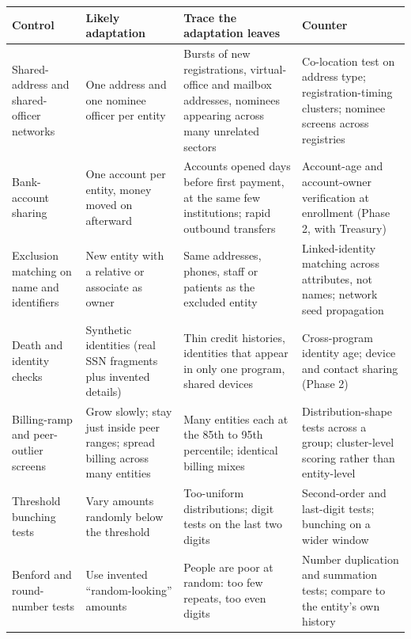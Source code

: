 \documentclass[letterpaper,11pt]{article}
\begin{document}
\begingroup\small\setlength{\tabcolsep}{4pt}\renewcommand{\arraystretch}{1.25}
\begin{longtable}[l]{@{}>{\raggedright\arraybackslash}p{}>{\raggedright\arraybackslash}p{}>{\raggedright\arraybackslash}p{}>{\raggedright\arraybackslash}p{}@{}}
\rowcolor{coolblack}\leavevmode\color{white}\bfseries Control & \leavevmode\color{white}\bfseries Likely adaptation & \leavevmode\color{white}\bfseries Trace the adaptation leaves & \leavevmode\color{white}\bfseries Counter \\
\endhead
Shared-address and shared-officer networks & One address and one nominee officer per entity & Bursts of new registrations, virtual-office and mailbox addresses, nominees appearing across many unrelated sectors & Co-location test on address type; registration-timing clusters; nominee screens across registries \\
Bank-account sharing & One account per entity, money moved on afterward & Accounts opened days before first payment, at the same few institutions; rapid outbound transfers & Account-age and account-owner verification at enrollment (Phase 2, with Treasury) \\
Exclusion matching on name and identifiers & New entity with a relative or associate as owner & Same addresses, phones, staff or patients as the excluded entity & Linked-identity matching across attributes, not names; network seed propagation \\
Death and identity checks & Synthetic identities (real SSN fragments plus invented details) & Thin credit histories, identities that appear in only one program, shared devices & Cross-program identity age; device and contact sharing (Phase 2) \\
Billing-ramp and peer-outlier screens & Grow slowly; stay just inside peer ranges; spread billing across many entities & Many entities each at the 85th to 95th percentile; identical billing mixes & Distribution-shape tests across a group; cluster-level scoring rather than entity-level \\
Threshold bunching tests & Vary amounts randomly below the threshold & Too-uniform distributions; digit tests on the last two digits & Second-order and last-digit tests; bunching on a wider window \\
Benford and round-number tests & Use invented ``random-looking'' amounts & People are poor at random: too few repeats, too even digits & Number duplication and summation tests; compare to the entity's own history \\

\end{longtable}
\end{document}
